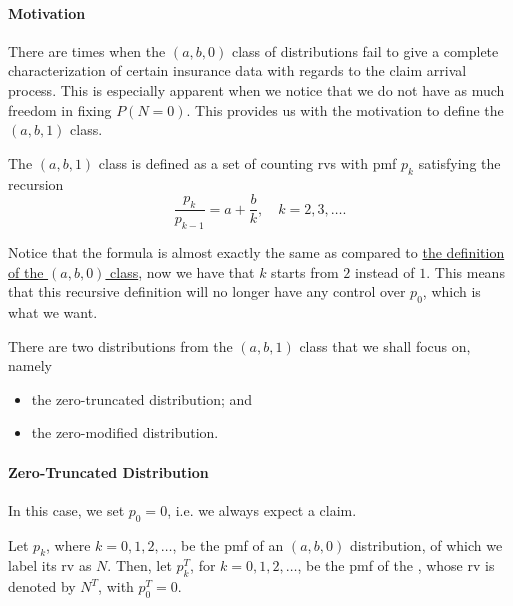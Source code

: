 \documentclass[notoc,notitlepage]{tufte-book}
\begin{document}
\paragraph{Motivation} There are times when the $(a, b, 0)$ class of distributions fail to give a complete characterization of certain insurance data with regards to the claim arrival process. This is especially apparent when we notice that we do not have as much freedom in fixing $P(N = 0)$. This provides us with the motivation to define the $(a, b, 1)$ class.

\begin{defn}[$(a, b, 1)$ Class]\label{defn:a_b_1_class}
  The $(a, b, 1)$ class is defined as a set of counting rvs with pmf $p_k$ satisfying the recursion
  \begin{equation*}
    \frac{p_k}{p_{k - 1}} = a + \frac{b}{k}, \quad k = 2, 3, \ldots .
  \end{equation*}
\end{defn}

\begin{remark}
  Notice that the formula is almost exactly the same as compared to \hyperref[defn:a_b_0_class]{the definition of the $(a, b, 0)$ class},  now we have that $k$ starts from $2$ instead of $1$. This means that this recursive definition will no longer have any control over $p_0$, which is what we want.
\end{remark}

There are two distributions from the $(a, b, 1)$ class that we shall focus on, namely
\begin{itemize}
  \item the zero-truncated distribution; and
  \item the zero-modified distribution.
\end{itemize}

\paragraph{Zero-Truncated Distribution}\label{par:zero_truncated_distribution} In this case, we set $p_0 = 0$, i.e. we always expect a claim.

Let $p_k$, where $k = 0, 1, 2, \ldots$, be the pmf of an $(a, b, 0)$ distribution, of which we label its rv as $N$. Then, let $p_k^T$, for $k = 0, 1, 2, \ldots$, be the pmf of the , whose rv is denoted by $N^T$, with $p_0^T = 0$.
\end{document}
